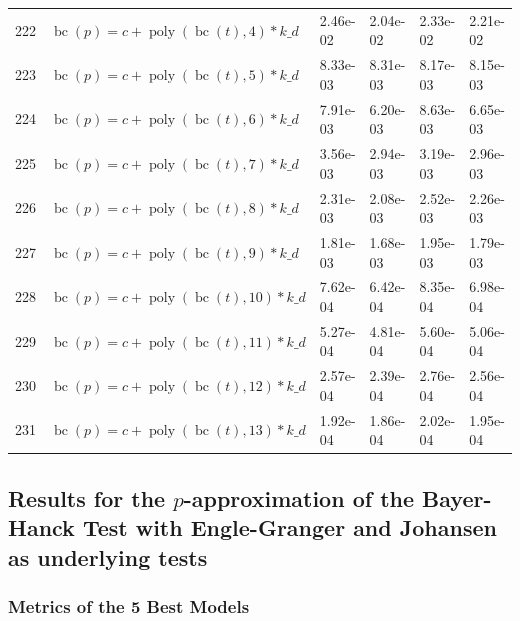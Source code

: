 \documentclass[12pt,a4paper]{article}
\DeclareMathOperator{\bc}{bc}
\DeclareMathOperator{\poly}{poly}
\begin{document}
\begin{longtable}[t]{ll>{\raggedleft\arraybackslash}p{2cm}>{\raggedleft\arraybackslash}p{2cm}>{\raggedleft\arraybackslash}p{2cm}>{\raggedleft\arraybackslash}p{2cm}}
222 & $\bc(p) = c + \poly\left( \bc(t), 4 \right) * k\_d$ & 2.46e-02 & 2.04e-02 & 2.33e-02 & 2.21e-02\\
\rowcolor{gray!6}  223 & $\bc(p) = c + \poly\left( \bc(t), 5 \right) * k\_d$ & 8.33e-03 & 8.31e-03 & 8.17e-03 & 8.15e-03\\
224 & $\bc(p) = c + \poly\left( \bc(t), 6 \right) * k\_d$ & 7.91e-03 & 6.20e-03 & 8.63e-03 & 6.65e-03\\
\rowcolor{gray!6}  225 & $\bc(p) = c + \poly\left( \bc(t), 7 \right) * k\_d$ & 3.56e-03 & 2.94e-03 & 3.19e-03 & 2.96e-03\\
226 & $\bc(p) = c + \poly\left( \bc(t), 8 \right) * k\_d$ & 2.31e-03 & 2.08e-03 & 2.52e-03 & 2.26e-03\\
\rowcolor{gray!6}  227 & $\bc(p) = c + \poly\left( \bc(t), 9 \right) * k\_d$ & 1.81e-03 & 1.68e-03 & 1.95e-03 & 1.79e-03\\
228 & $\bc(p) = c + \poly\left( \bc(t), 10 \right) * k\_d$ & 7.62e-04 & 6.42e-04 & 8.35e-04 & 6.98e-04\\
\rowcolor{gray!6}  229 & $\bc(p) = c + \poly\left( \bc(t), 11 \right) * k\_d$ & 5.27e-04 & 4.81e-04 & 5.60e-04 & 5.06e-04\\
230 & $\bc(p) = c + \poly\left( \bc(t), 12 \right) * k\_d$ & 2.57e-04 & 2.39e-04 & 2.76e-04 & 2.56e-04\\
\rowcolor{gray!6}  231 & $\bc(p) = c + \poly\left( \bc(t), 13 \right) * k\_d$ & 1.92e-04 & 1.86e-04 & 2.02e-04 & 1.95e-04\\*
\end{longtable}
\endgroup{}

\hypertarget{results-for-the-p-approximation-of-the-bayer-hanck-test-with-engle-granger-and-johansen-as-underlying-tests}{%
\subsection{\texorpdfstring{Results for the \(p\)-approximation of the
Bayer-Hanck Test with Engle-Granger and Johansen as underlying
tests}{Results for the p-approximation of the Bayer-Hanck Test with Engle-Granger and Johansen as underlying tests}}\label{results-for-the-p-approximation-of-the-bayer-hanck-test-with-engle-granger-and-johansen-as-underlying-tests}}

\hypertarget{metrics-of-the-5-best-models-1}{%
\subsubsection{Metrics of the 5 Best
Models}\label{metrics-of-the-5-best-models-1}}
\end{document}
